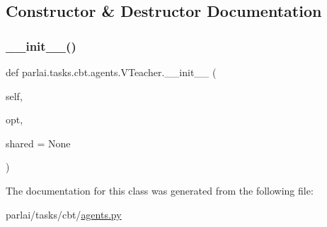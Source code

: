 \subsection{Constructor \& Destructor Documentation}
\mbox{\label{classparlai_1_1tasks_1_1cbt_1_1agents_1_1VTeacher_a19797ded538cc0a6d4cd544c4e2b6b1b}} 
\subsubsection{\texorpdfstring{\+\_\+\+\_\+init\+\_\+\+\_\+()}{\_\_init\_\_()}}
{\footnotesize\ttfamily def parlai.\+tasks.\+cbt.\+agents.\+V\+Teacher.\+\_\+\+\_\+init\+\_\+\+\_\+ (\begin{DoxyParamCaption}\item[{}]{self,  }\item[{}]{opt,  }\item[{}]{shared = {\ttfamily None} }\end{DoxyParamCaption})}



The documentation for this class was generated from the following file\+:\begin{DoxyCompactItemize}
\item 
parlai/tasks/cbt/\hyperlink{parlai_2tasks_2cbt_2agents_8py}{agents.\+py}\end{DoxyCompactItemize}
